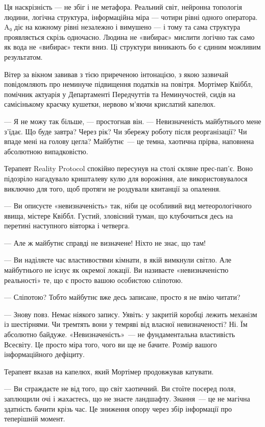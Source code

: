 \documentclass[12pt, a4paper, openany]{book}
\begin{document}
Ця наскрізність — не збіг і не метафора. Реальний світ, нейронна топологія людини, логічна структура, інформаційна міра — чотири рівні одного оператора. A₀ діє на кожному рівні незалежно і вимушено — і тому та сама структура проявляється скрізь одночасно. Людина не «вибирає» мислити логічно так само як вода не «вибирає» текти вниз. Ці структури виникають бо є єдиним можливим результатом.


\begin{realitybox}
Вітер за вікном завивав з тією приреченою інтонацією, з якою зазвичай повідомляють про неминуче підвищення податків на повітря. Мортімер Квіббл, помічник актуарія у Департаменті Передчуттів та Неминучостей, сидів на самісінькому краєчку кушетки, нервово м'яючи крислатий капелюх.

--- Я не можу так більше, --- простогнав він. --- Невизначеність майбутнього мене з'їдає. Що буде завтра? Через рік? Чи збережу роботу після реорганізації? Чи впаде мені на голову цегла? Майбутнє~--- це темна, хаотична прірва, наповнена абсолютною випадковістю.

\medskip
Терапевт Reality Protocol спокійно пересунув на столі скляне прес-пап'є. Воно підозріло нагадувало кришталеву кулю для ворожіння, але використовувалося виключно для того, щоб протяги не роздували квитанції за опалення.

--- Ви описуєте «невизначеність» так, ніби це особливий вид метеорологічного явища, містере Квіббл. Густий, зловісний туман, що клубочиться десь на перетині наступного вівторка і четверга.

--- Але ж майбутнє справді не визначене! Ніхто не знає, що там!

--- Ви наділяєте час властивостями кімнати, в якій вимкнули світло. Але майбутнього не існує як окремої локації. Ви називаєте «невизначеністю реальності» те, що є просто вашою особистою сліпотою.

--- Сліпотою? Тобто майбутнє вже десь записане, просто я не вмію читати?

--- Знову повз. Немає ніякого запису. Уявіть: у закритій коробці лежить механізм із шестірнями. Чи тремтять вони у темряві від власної невизначеності? Ні. Їм абсолютно байдуже. «Невизначеність»~--- не фундаментальна властивість Всесвіту. Це просто міра того, чого ви ще не бачите. Розмір вашого інформаційного дефіциту.

\medskip
Терапевт вказав на капелюх, який Мортімер продовжував катувати.

--- Ви страждаєте не від того, що світ хаотичний. Ви стоїте посеред поля, заплющили очі і жахаєтесь, що не знаєте ландшафту. Знання~--- це не магічна здатність бачити крізь час. Це зниження опору через збір інформації про теперішній момент.


\end{realitybox}
\end{document}
